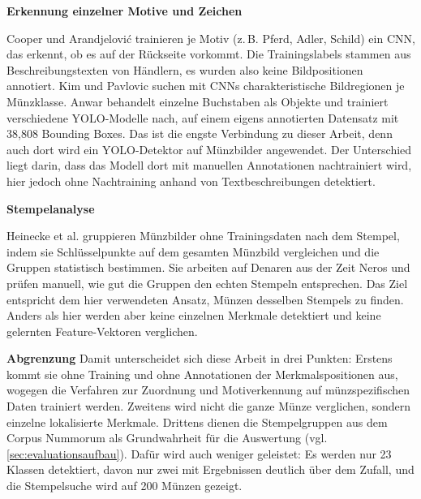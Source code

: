 \vspace{\baselineskip}

\noindent \textbf{Erkennung einzelner Motive und Zeichen} 

\noindent Cooper und Arandjelović \cite{cooper2020learning} trainieren je Motiv (z.\,B. Pferd, Adler, Schild) ein CNN, das erkennt, ob es auf der Rückseite vorkommt. Die Trainingslabels stammen aus Beschreibungstexten von Händlern, es wurden also keine Bildpositionen annotiert. Kim und Pavlovic \cite{kim2016discovering} suchen mit CNNs charakteristische Bildregionen je Münzklasse. Anwar \cite{anwar2026reading} behandelt einzelne Buchstaben als Objekte und trainiert verschiedene YOLO-Modelle nach, auf einem eigens annotierten Datensatz mit 38,808 Bounding Boxes. Das ist die engste Verbindung zu dieser Arbeit, denn auch dort wird ein YOLO-Detektor auf Münzbilder angewendet. Der Unterschied liegt darin, dass das Modell dort mit manuellen Annotationen nachtrainiert wird, hier jedoch ohne Nachtraining anhand von Textbeschreibungen detektiert.  

\vspace{\baselineskip}

\noindent \textbf{Stempelanalyse} 

\noindent Heinecke et al. \cite{heinecke2021unsupervised} gruppieren Münzbilder ohne Trainingsdaten nach dem Stempel, indem sie Schlüsselpunkte auf dem gesamten Münzbild vergleichen und die Gruppen statistisch bestimmen. Sie arbeiten auf Denaren aus der Zeit Neros und prüfen manuell, wie gut die Gruppen den echten Stempeln entsprechen. Das Ziel entspricht dem hier verwendeten Ansatz, Münzen desselben Stempels zu finden. Anders als hier werden aber keine einzelnen Merkmale detektiert und keine gelernten Feature-Vektoren verglichen.

\vspace{\baselineskip}

\noindent \textbf{Abgrenzung} 
\noindent Damit unterscheidet sich diese Arbeit in drei Punkten: Erstens kommt sie ohne Training und ohne Annotationen der Merkmalspositionen aus, wogegen die Verfahren zur Zuordnung und Motiverkennung \cite{guo2023siamese,cooper2020learning,anwar2026reading} auf münzspezifischen Daten trainiert werden. Zweitens wird nicht die ganze Münze verglichen, sondern einzelne lokalisierte Merkmale. Drittens dienen die Stempelgruppen aus dem Corpus Nummorum als Grundwahrheit für die Auswertung (vgl. \cref{sec:evaluationsaufbau}). Dafür wird auch weniger geleistet: Es werden nur 23 Klassen detektiert, davon nur zwei mit Ergebnissen deutlich über dem Zufall, und die Stempelsuche wird auf 200 Münzen gezeigt.

